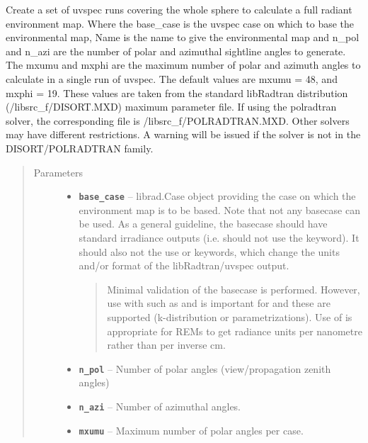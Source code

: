 \documentclass[a4paper,10pt,english]{sphinxmanual}
\begin{document}
\begin{fulllineitems}
Create a set of uvspec runs covering the whole sphere to calculate a full radiant environment map.
Where the base\_case is the uvspec case on which to base the environmental map, Name is the name to give the
environmental map and n\_pol and n\_azi are the number of polar and azimuthal sightline angles to generate. The
mxumu and mxphi are the maximum number of polar and azimuth angles to calculate in a single run of uvspec.
The default values are mxumu = 48, and mxphi = 19. These values are taken from the standard libRadtran
distribution (/libsrc\_f/DISORT.MXD) maximum parameter file. If using the polradtran solver, the corresponding
file is /libsrc\_f/POLRADTRAN.MXD. Other solvers may have different restrictions. A warning will be issued if
the solver is not in the DISORT/POLRADTRAN family.
\begin{quote}\begin{description}
\item[{Parameters}] \leavevmode\begin{itemize}
\item {} 
\textbf{\texttt{base\_case}} -- 
librad.Case object providing the case on which the environment map is to be based. Note
that not any basecase can be used. As a general guideline, the basecase should have standard irradiance
outputs (i.e. should not use the  keyword). It should also not the use  or
 keywords, which change the units and/or format of the libRadtran/uvspec output.
\begin{quote}

Minimal validation of the basecase is performed. However, use with  such as  and
 is important for  and these are supported (k-distribution or 
parametrizations). Use of  is appropriate for  REMs to get
radiance units per nanometre rather than per inverse cm.
\end{quote}


\item {} 
\textbf{\texttt{n\_pol}} -- Number of polar angles (view/propagation zenith angles)

\item {} 
\textbf{\texttt{n\_azi}} -- Number of azimuthal angles.

\item {} 
\textbf{\texttt{mxumu}} -- Maximum number of polar angles per case.


\end{itemize}
\end{description}
\end{quote}
\end{fulllineitems}
\end{document}
